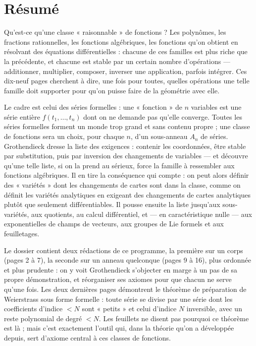 \documentclass[11pt,a4paper]{article}
\begin{document}
\section*{Résumé}

\begin{resume}
Qu'est-ce qu'une classe « raisonnable » de fonctions ? Les polynômes, les
fractions rationnelles, les fonctions algébriques, les fonctions qu'on obtient
en résolvant des équations différentielles : chacune de ces familles est plus
riche que la précédente, et chacune est stable par un certain nombre
d'opérations — additionner, multiplier, composer, inverser une application,
parfois intégrer. Ces dix-neuf pages cherchent à dire, une fois pour toutes,
quelles opérations une telle famille doit supporter pour qu'on puisse faire de
la géométrie avec elle.

Le cadre est celui des séries formelles : une « fonction » de $n$ variables
est une série entière $f(t_1, \ldots, t_n)$ dont on ne demande pas qu'elle
converge. Toutes les séries formelles forment un monde trop grand et sans
contenu propre ; une classe de fonctions sera un choix, pour chaque $n$, d'un
sous-anneau $A_n$ de séries. Grothendieck dresse la liste des exigences :
contenir les coordonnées, être stable par substitution, puis par inversion des
changements de variables — et découvre qu'une telle liste, si on la prend au
sérieux, force la famille à ressembler aux fonctions algébriques. Il en tire
la conséquence qui compte : on peut alors définir des « variétés » dont les
changements de cartes sont dans la classe, comme on définit les variétés
analytiques en exigeant des changements de cartes analytiques plutôt que
seulement différentiables. Il pousse ensuite la liste jusqu'aux sous-variétés,
aux quotients, au calcul différentiel, et — en caractéristique nulle — aux
exponentielles de champs de vecteurs, aux groupes de Lie formels et aux
feuilletages.

Le dossier contient deux rédactions de ce programme, la première sur un corps
(pages 2 à 7), la seconde sur un anneau quelconque (pages 9 à 16), plus
ordonnée et plus prudente : on y voit Grothendieck s'objecter en marge à un
pas de sa propre démonstration, et réorganiser ses axiomes pour que chacun ne
serve qu'une fois. Les deux dernières pages démontrent le théorème de
préparation de Weierstrass sous forme formelle : toute série se divise par une
série dont les coefficients d'indice $< N$ sont « petits » et celui d'indice
$N$ inversible, avec un reste polynomial de degré $< N$. Les feuillets ne disent pas pourquoi ce théorème
est là ; mais c'est exactement l'outil qui, dans la théorie qu'on a
développée depuis, sert d'axiome central à ces classes de fonctions.


\end{resume}
\end{document}

